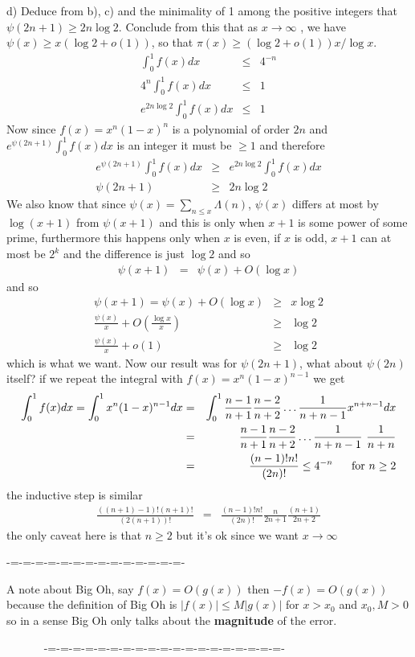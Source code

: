 \documentclass[aps,preprint,preprintnumbers,nofootinbib,showpacs,prd]{revtex4-1}
\newcommand{\nbea}{\begin{eqnarray*}}
\newcommand{\neea}{\end{eqnarray*}}
\begin{document}
d) Deduce from b), c) and the minimality of 1 among the positive integers that $\psi(2n + 1) \ge 2n \log 2$. Conclude from this that as $x \to \infty$ , we have $\psi(x) \ge x(\log 2 + o(1))$, so that $\pi(x) \ge (\log 2 + o(1))x/ \log x$.
%
\nbea
\int^1_0 f(x) dx & \le & 4^{-n} \\
4^{n} \int^1_0 f(x) dx & \le & 1 \\
e^{2n \log 2} \int^1_0 f(x) dx & \le & 1
\neea
%
Now since $f(x) = x^n(1-x)^n$ is a polynomial of order $2n$ and $e^{\psi(2n+1)}\int_0^1 f(x) dx$ is an integer it must be $\ge 1$ and therefore
%
\nbea
e^{\psi(2n+1)}\int_0^1 f(x) dx & \ge & e^{2n \log 2} \int^1_0 f(x) dx \\
\psi(2n+1) & \ge & 2n \log 2
\neea
%
We also know that since $\psi(x) = \sum_{n\le x} \Lambda(n)$, $\psi(x)$ differs at most by $\log (x + 1)$ from $\psi(x+1)$ and this is only when $x + 1$ is some power of some prime, furthermore this happens only when $x$ is even, if $x$ is odd, $x+1$ can at most be $2^k$ and the difference is just $\log 2$ and so
%
\nbea
\psi(x+1) & = & \psi(x) + O(\log x)
\neea
%
and so
%
\nbea
\psi(x+1) = \psi(x) + O(\log x) & \ge & x \log 2 \\
\frac{\psi(x)}{x} + O \left ( \frac{\log x}{x} \right ) & \ge & \log 2 \\
\frac{\psi(x)}{x} + o(1) & \ge & \log 2
\neea
%
which is what we want. Now our result was for $\psi(2n+1)$, what about $\psi(2n)$ itself? if we repeat the integral with $f(x) = x^n(1-x)^{n-1}$ we get
%
\nbea
\int^1_0 f(x) dx = \int_0^1 x^n(1-x)^{n-1} dx & = & \int_0^1 \frac{n-1}{n+1} \frac{n-2}{n+2} \dots \frac{1}{n + n - 1} x^{n+n - 1} dx \\
& = & \frac{n-1}{n+1} \frac{n-2}{n+2} \dots \frac{1}{n + n - 1} ~ \frac{1}{n + n} \\
& = & \frac{(n-1)!n!}{(2n)!} \le 4^{-n} ~~~~~ {\rm for~} n \ge 2
\neea
%
the inductive step is similar
%
\nbea
\frac{((n+1)-1)!(n+1)!}{(2(n+1))!} & = & \frac{(n-1)!n!}{(2n)!} \frac{n}{2n+1} \frac{(n+1)}{2n+2}
\neea
%
the only caveat here is that $n \ge 2$ but it's ok since we want $x \to \infty$


-=-=-=-=-=-=-=-=-=-=-=-=-=-=-


A note about Big Oh, say $f(x) = O(g(x))$ then $-f(x) = O(g(x))$ because the definition of Big Oh is $|f(x)| \le M|g(x)|$ for $x > x_0$ and $x_0, M > 0$ so in a sense Big Oh only talks about the {\bf magnitude} of the error.




~~~~~~ -=-=-=-=-=-=-=-=-=-=-=-=-=-=-=-=-=-=-=-
\end{document}
